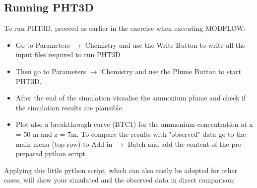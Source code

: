 \subsection[Running PHT3D]{Running PHT3D}

To run PHT3D, proceed as earlier in the exercise when executing MODFLOW:

\begin{itemize}

\item Go to {\color{blue}Parameters} $\rightarrow$ {\color{blue} Chemistry} and use 
the {\color{blue}Write Button} to write all the input files required to run PHT3D

\item Then go to {\color{blue}Parameters} $\rightarrow$ {\color{blue}Chemistry} and use the {\color{blue}Plume Button} to start PHT3D.

\item After the end of the simulation visualise the ammonium plume and check if the 
simulation results are plausible. 

\item Plot also a breakthrough curve (BTC1) for the ammonium concentration at x = 50 m
and z = 7m. To compare the results with "observed" data go to the main menu (top row) 
to {\color{blue}Add-in}  $\rightarrow$ {\color{blue}Batch} and add the content 
of the pre-prepared python script.

\end{itemize}

Applying this little python script, which can also easily be adopted for other cases,
will show your simulated and the observed data in direct comparison:  \\



